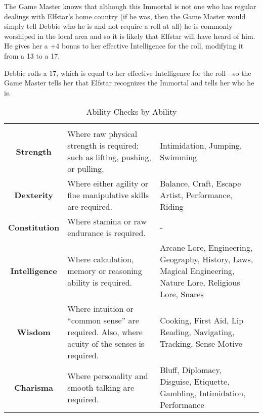 \begin{multicols*}{2}
{The Game Master knows that although this Immortal is not one who has regular dealings with Elfstar’s home country (if he was, then the Game Master would simply tell Debbie who he is and not require a roll at all) he is commonly worshiped in the local area and so it is likely that Elfstar will have heard of him. He gives her a +4 bonus to her effective Intelligence for the roll, modifying it from a 13 to a 17.

Debbie rolls a 17, which is equal to her effective Intelligence for the roll—so the Game Master tells her that Elfstar recognizes the Immortal and tells her who he is.}

\begin {table}[H]
  \caption{Ability Checks by Ability}
  \begin{tabularx}{\columnwidth}{>{\bfseries}cYY}
		 &  & \\
		Strength & Where raw physical strength is required; such as lifting, pushing, or pulling. & Intimidation, Jumping, Swimming\\
		Dexterity & Where either agility or fine manipulative skills are required. & Balance, Craft, Escape Artist, Performance, Riding\\
		Constitution & Where stamina or raw endurance is required. & -\\
		Intelligence & Where calculation, memory or reasoning ability is required. & Arcane Lore, Engineering, Geography, History, Laws, Magical Engineering, Nature Lore, Religious Lore, Snares\\
		Wisdom & Where intuition or “common sense” are required. Also, where acuity of the senses is required. & Cooking, First Aid, Lip Reading, Navigating, Tracking, Sense Motive\\
		Charisma & Where personality and smooth talking are required. & Bluff, Diplomacy, Disguise, Etiquette, Gambling, Intimidation, Performance\
  \end {tabularx}
\end {table}
\end{multicols*}
